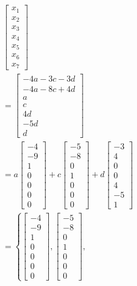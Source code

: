 \documentclass{article}
\begin{document}
\begin{align*}
	& \begin{bmatrix} x_1 \\ x_2 \\ x_3 \\ x_4 \\ x_5 \\ x_6 \\ x_7 \end{bmatrix} \\
	& = \begin{bmatrix}
		-4a - 3c - 3d \\
		-4a - 8c + 4d \\
		a \\
		c \\
		4d \\
		-5d \\
		d
	\end{bmatrix} \\
	& = a \begin{bmatrix} -4 \\ -9 \\ 1 \\ 0 \\ 0 \\ 0 \\ 0 \end{bmatrix}
	+ c \begin{bmatrix} -5 \\ -8 \\ 0 \\ 1 \\ 0 \\ 0 \\ 0 \end{bmatrix}
	+ d \begin{bmatrix} -3 \\ 4 \\ 0 \\ 0 \\ 4 \\ -5 \\ 1 \end{bmatrix} \\
	& = \left\{
		\begin{bmatrix} -4 \\ -9 \\ 1 \\ 0 \\ 0 \\ 0 \\ 0 \end{bmatrix},
		\begin{bmatrix} -5 \\ -8 \\ 0 \\ 1 \\ 0 \\ 0 \\ 0 \end{bmatrix},

\end{align*}
\end{document}
